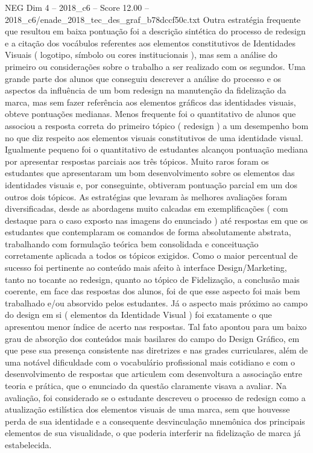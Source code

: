 \begin{textsample}{NEG Dim 4 – 2018\_c6 – Score 12.00 – 2018\_c6/enade\_2018\_tec\_des\_graf\_b78dccf50c.txt}
Outra estratégia frequente que resultou em baixa pontuação foi a descrição sintética do processo de redesign e a citação dos vocábulos referentes aos elementos constitutivos de Identidades Visuais ( logotipo, símbolo ou cores institucionais ), mas sem a análise do primeiro ou considerações sobre o trabalho a ser realizado com os segundos.
Uma grande parte dos alunos que conseguiu descrever a análise do processo e os aspectos da influência de um bom redesign na manutenção da fidelização da marca, mas sem fazer referência aos elementos gráficos das identidades visuais, obteve pontuações medianas.
Menos frequente foi o quantitativo de alunos que associou a resposta correta do primeiro tópico ( redesign ) a um desempenho bom no que diz respeito aos elementos visuais constitutivos de uma identidade visual.
Igualmente pequeno foi o quantitativo de estudantes alcançou pontuação mediana por apresentar respostas parciais aos três tópicos.
Muito raros foram os estudantes que apresentaram um bom desenvolvimento sobre os elementos das identidades visuais e, por conseguinte, obtiveram pontuação parcial em um dos outros dois tópicos.
As estratégias que levaram às melhores avaliações foram diversificadas, desde as abordagens muito calcadas em exemplificações ( com destaque para o caso exposto nas imagens do enunciado ) até respostas em que os estudantes que contemplaram os comandos de forma absolutamente abstrata, trabalhando com formulação teórica bem consolidada e conceituação corretamente aplicada a todos os tópicos exigidos.
Como o maior percentual de sucesso foi pertinente ao conteúdo mais afeito à interface Design/Marketing, tanto no tocante ao redesign, quanto ao tópico de Fidelização, a conclusão mais coerente, em face das respostas dos alunos, foi de que esse aspecto foi mais bem trabalhado e/ou absorvido pelos estudantes.
Já o aspecto mais próximo ao campo do design em si ( elementos da Identidade Visual ) foi exatamente o que apresentou menor índice de acerto nas respostas.
Tal fato apontou para um baixo grau de absorção dos conteúdos mais basilares do campo do Design Gráfico, em que pese sua presença consistente nas diretrizes e nas grades curriculares, além de uma notável dificuldade com o vocabulário profissional mais cotidiano e com o desenvolvimento de respostas que articulem com desenvoltura a associação entre teoria e prática, que o enunciado da questão claramente visava a avaliar.
Na avaliação, foi considerado se o estudante descreveu o processo de redesign como a atualização estilística dos elementos visuais de uma marca, sem que houvesse perda de sua identidade e a consequente desvinculação mnemônica dos principais elementos de sua visualidade, o que poderia interferir na fidelização de marca já estabelecida.

\end{textsample}
